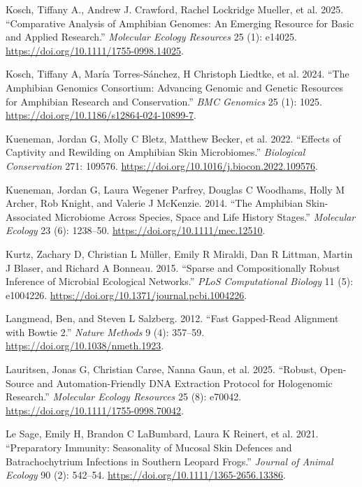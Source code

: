 \documentclass[
  12pt,
]{article}
\newlength{\cslhangindent}
\newenvironment{CSLReferences}[2] %
 {\begin{list}{}{%
  \setlength{\itemindent}{0pt}
  \setlength{\leftmargin}{0pt}
  \setlength{\parsep}{0pt}
  \ifodd #1
   \setlength{\leftmargin}{\cslhangindent}
   \setlength{\itemindent}{-1\cslhangindent}
  \fi
  \setlength{\itemsep}{#2\baselineskip}}}
 {\end{list}}
\begin{document}
\begin{CSLReferences}{1}{1}
Kosch, Tiffany A., Andrew J. Crawford, Rachel Lockridge Mueller, et al.
2025. {``Comparative Analysis of Amphibian Genomes: {An} Emerging
Resource for Basic and Applied Research.''} \emph{Molecular Ecology
Resources} 25 (1): e14025.
\url{https://doi.org/10.1111/1755-0998.14025}.

{Kosch, Tiffany A, María Torres-Sánchez, H Christoph Liedtke, et al.}
2024. {``The {Amphibian} {Genomics} {Consortium}: Advancing Genomic and
Genetic Resources for Amphibian Research and Conservation.''} \emph{BMC
Genomics} 25 (1): 1025.
\url{https://doi.org/10.1186/s12864-024-10899-7}.

{Kueneman, Jordan G, Molly C Bletz, Matthew Becker, et al.} 2022.
{``Effects of Captivity and Rewilding on Amphibian Skin Microbiomes.''}
\emph{Biological Conservation} 271: 109576.
\url{https://doi.org/10.1016/j.biocon.2022.109576}.

Kueneman, Jordan G, Laura Wegener Parfrey, Douglas C Woodhams, Holly M
Archer, Rob Knight, and Valerie J McKenzie. 2014. {``The Amphibian
Skin-Associated Microbiome Across Species, Space and Life History
Stages.''} \emph{Molecular Ecology} 23 (6): 1238--50.
\url{https://doi.org/10.1111/mec.12510}.

Kurtz, Zachary D, Christian L Müller, Emily R Miraldi, Dan R Littman,
Martin J Blaser, and Richard A Bonneau. 2015. {``Sparse and
Compositionally Robust Inference of Microbial Ecological Networks.''}
\emph{PLoS Computational Biology} 11 (5): e1004226.
\url{https://doi.org/10.1371/journal.pcbi.1004226}.

Langmead, Ben, and Steven L Salzberg. 2012. {``Fast Gapped-Read
Alignment with {Bowtie} 2.''} \emph{Nature Methods} 9 (4): 357--59.
\url{https://doi.org/10.1038/nmeth.1923}.

{Lauritsen, Jonas G, Christian Carøe, Nanna Gaun, et al.} 2025.
{``Robust, {Open}-{Source} and {Automation}-{Friendly} {DNA}
{Extraction} {Protocol} for {Hologenomic} {Research}.''} \emph{Molecular
Ecology Resources} 25 (8): e70042.
\url{https://doi.org/10.1111/1755-0998.70042}.

Le Sage, Emily H, Brandon C LaBumbard, Laura K Reinert, et al. 2021.
{``Preparatory Immunity: {Seasonality} of Mucosal Skin Defences and
{Batrachochytrium} Infections in {Southern} Leopard Frogs.''}
\emph{Journal of Animal Ecology} 90 (2): 542--54.
\url{https://doi.org/10.1111/1365-2656.13386}.


\end{CSLReferences}
\end{document}
